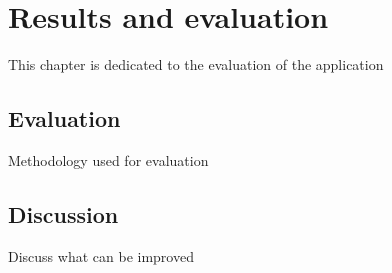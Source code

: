 \chapter{Results and evaluation}
\label{chap:results}

This chapter is dedicated to the evaluation of the application

\section{Evaluation}
\label{sec:results_eval}

Methodology used for evaluation

\section{Discussion}
\label{sec:results_discussion}

Discuss what can be improved